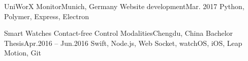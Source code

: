     \resumeSubheading
      {UniWorX Monitor}{Munich, Germany}
      {Website development}{Mar. 2017}
      \resumeItemListStart
          {Python, Polymer, Express, Electron}
      \resumeItemListEnd

    \resumeSubheading
      {Smart Watches Contact-free Control Modalities}{Chengdu, China}
      {Bachelor Thesis}{Apr.2016 -- Jun.2016}
      \resumeItemListStart
          {Swift, Node.js, Web Socket, watchOS, iOS, Leap Motion, Git}
      \resumeItemListEnd

  \resumeSubHeadingListEnd